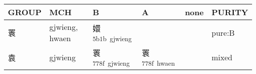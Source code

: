 \documentclass[14pt,a4paper]{scrartcl}
\begin{document}
\begin{longtable}[c]{@{}llllll@{}}
\toprule
\begin{minipage}[b]{0.14\columnwidth}\raggedright\strut
GROUP
\strut\end{minipage} &
\begin{minipage}[b]{0.14\columnwidth}\raggedright\strut
MCH
\strut\end{minipage} &
\begin{minipage}[b]{0.14\columnwidth}\raggedright\strut
B
\strut\end{minipage} &
\begin{minipage}[b]{0.14\columnwidth}\raggedright\strut
A
\strut\end{minipage} &
\begin{minipage}[b]{0.14\columnwidth}\raggedright\strut
none
\strut\end{minipage} &
\begin{minipage}[b]{0.14\columnwidth}\raggedright\strut
PURITY
\strut\end{minipage}\tabularnewline
\midrule
\endhead
\begin{minipage}[t]{0.14\columnwidth}\raggedright\strut
瞏
\strut\end{minipage} &
\begin{minipage}[t]{0.14\columnwidth}\raggedright\strut
gjwieng, hwaen
\strut\end{minipage} &
\begin{minipage}[t]{0.14\columnwidth}\raggedright\strut
嬛\textsuperscript{5b1b~gjwieng}
\strut\end{minipage} &
\begin{minipage}[t]{0.14\columnwidth}\raggedright\strut
\strut\end{minipage} &
\begin{minipage}[t]{0.14\columnwidth}\raggedright\strut
\strut\end{minipage} &
\begin{minipage}[t]{0.14\columnwidth}\raggedright\strut
pure:B
\strut\end{minipage}\tabularnewline
\begin{minipage}[t]{0.14\columnwidth}\raggedright\strut
袁
\strut\end{minipage} &
\begin{minipage}[t]{0.14\columnwidth}\raggedright\strut
gjwieng
\strut\end{minipage} &
\begin{minipage}[t]{0.14\columnwidth}\raggedright\strut
瞏\textsuperscript{778f~gjwieng}
\strut\end{minipage} &
\begin{minipage}[t]{0.14\columnwidth}\raggedright\strut
瞏\textsuperscript{778f~hwaen}
\strut\end{minipage} &
\begin{minipage}[t]{0.14\columnwidth}\raggedright\strut
\strut\end{minipage} &
\begin{minipage}[t]{0.14\columnwidth}\raggedright\strut
mixed
\strut\end{minipage}\tabularnewline
\bottomrule
\end{longtable}
\end{document}
